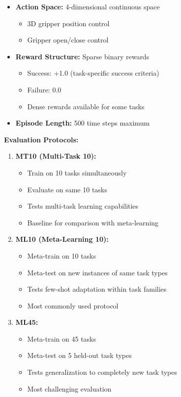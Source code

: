 \documentclass[12pt]{article}
\newcommand{\ieee}[1]{\textcolor{IEEEBlue}{\textbf{#1}}}
\begin{document}
{{\begin{itemize}
				\item \textbf{Action Space:} 4-dimensional continuous space
				\begin{itemize}
					\item 3D gripper position control
					\item Gripper open/close control
				\end{itemize}
				
				\item \textbf{Reward Structure:} Sparse binary rewards
				\begin{itemize}
					\item Success: +1.0 (task-specific success criteria)
					\item Failure: 0.0
					\item Dense rewards available for some tasks
				\end{itemize}
				
				\item \textbf{Episode Length:} 500 time steps maximum
			\end{itemize}
			
			\ieee{Evaluation Protocols:}
			
			\begin{enumerate}
				\item \textbf{MT10 (Multi-Task 10):}
				\begin{itemize}
					\item Train on 10 tasks simultaneously
					\item Evaluate on same 10 tasks
					\item Tests multi-task learning capabilities
					\item Baseline for comparison with meta-learning
				\end{itemize}
				
				\item \textbf{ML10 (Meta-Learning 10):}
				\begin{itemize}
					\item Meta-train on 10 tasks
					\item Meta-test on new instances of same task types
					\item Tests few-shot adaptation within task families
					\item Most commonly used protocol
				\end{itemize}
				
				\item \textbf{ML45:}
				\begin{itemize}
					\item Meta-train on 45 tasks
					\item Meta-test on 5 held-out task types
					\item Tests generalization to completely new task types
					\item Most challenging evaluation
				\end{itemize}
			\end{enumerate}
			
}}
\end{document}

